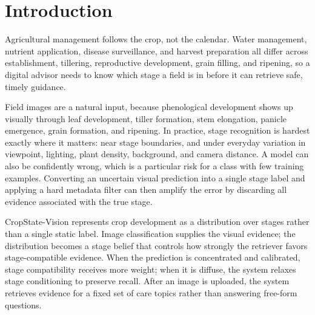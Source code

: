 \documentclass{llncs}
\begin{document}
\section{Introduction}

Agricultural management follows the crop, not the calendar. Water management, nutrient application, disease surveillance, and harvest preparation all differ across establishment, tillering, reproductive development, grain filling, and ripening, so a digital advisor needs to know which stage a field is in before it can retrieve safe, timely guidance.

Field images are a natural input, because phenological development shows up visually through leaf development, tiller formation, stem elongation, panicle emergence, grain formation, and ripening. In practice, stage recognition is hardest exactly where it matters: near stage boundaries, and under everyday variation in viewpoint, lighting, plant density, background, and camera distance. A model can also be confidently wrong, which is a particular risk for a class with few training examples. Converting an uncertain visual prediction into a single stage label and applying a hard metadata filter can then amplify the error by discarding all evidence associated with the true stage.

CropState-Vision represents crop development as a distribution over stages rather than a single static label. Image classification supplies the visual evidence; the distribution becomes a stage belief that controls how strongly the retriever favors stage-compatible evidence. When the prediction is concentrated and calibrated, stage compatibility receives more weight; when it is diffuse, the system relaxes stage conditioning to preserve recall. After an image is uploaded, the system retrieves evidence for a fixed set of care topics rather than answering free-form questions.
\end{document}
